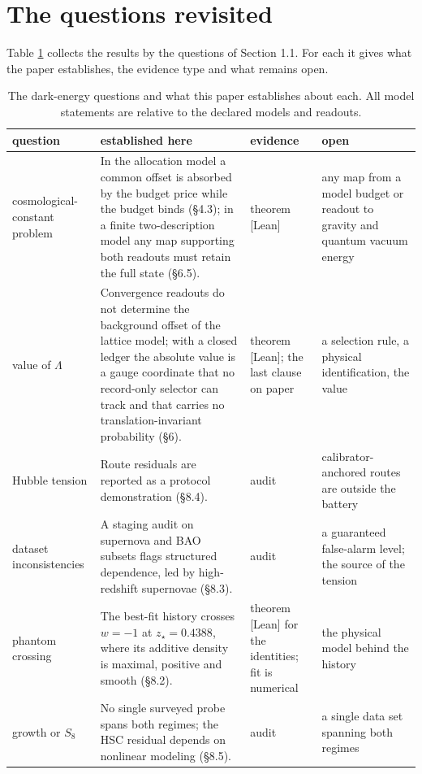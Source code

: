 \hypertarget{the-questions-revisited}{%
\section{The questions revisited}\label{the-questions-revisited}}

Table \ref{tab:atlas} collects the results by the questions of Section
1.1. For each it gives what the paper establishes, the evidence type and
what remains open.

\begin{table}[!htbp]
\centering
\caption{The dark-energy questions and what this paper establishes about each. All model statements are relative to the
declared models and readouts.}
\label{tab:atlas}
\footnotesize
\begin{tabularx}{\textwidth}{@{}p{2.6cm}X p{2.0cm}X@{}}
\toprule
question & established here & evidence & open \\
\midrule
cosmological-constant problem & In the allocation model a common offset is absorbed by the budget price while the budget binds (\S4.3); in a finite two-description model any map supporting both readouts must retain the full state (\S6.5). & theorem [Lean] & any map from a model budget or readout to gravity and quantum vacuum energy \\
value of $\Lambda$ & Convergence readouts do not determine the background offset of the lattice model; with a closed ledger the absolute value is a gauge coordinate that no record-only selector can track and that carries no translation-invariant probability (\S6). & theorem [Lean]; the last clause on paper & a selection rule, a physical identification, the value \\
Hubble tension & Route residuals are reported as a protocol demonstration (\S8.4). & audit & calibrator-anchored routes are outside the battery \\
dataset inconsistencies & A staging audit on supernova and BAO subsets flags structured dependence, led by high-redshift supernovae (\S8.3). & audit & a guaranteed false-alarm level; the source of the tension \\
phantom crossing & The best-fit history crosses $w=-1$ at $z_\star=0.4388$, where its additive density is maximal, positive and smooth (\S8.2). & theorem [Lean] for the identities; fit is numerical & the physical model behind the history \\
growth or $S_8$ & No single surveyed probe spans both regimes; the HSC residual depends on nonlinear modeling (\S8.5). & audit & a single data set spanning both regimes \\

\end{tabularx}
\end{table}
